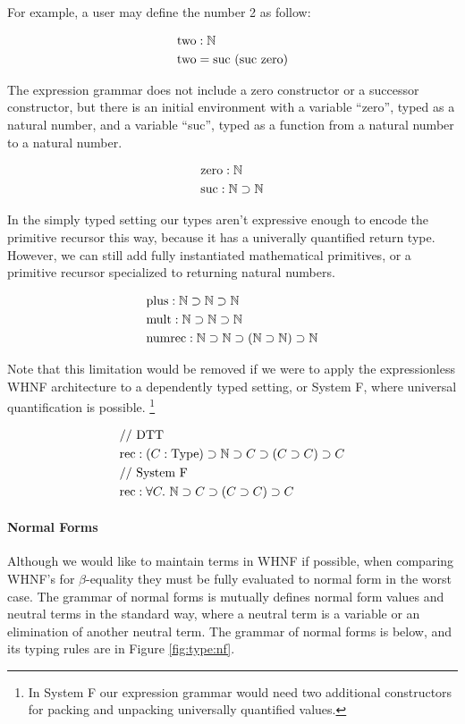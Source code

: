 \documentclass[preprint,authoryear]{sigplanconf}
\def\asc{:}
\def\arr{\supset}
\def\nat{\mathbb{N}}
\def\zero{\con{zero}}
\newcommand{\suc}[1]{\con{suc}~#1}
\newcommand{\con}[1]{\textmd{#1}}
\newcommand{\reffig}[1]{Figure \ref{fig:#1}}
\begin{document}
For example, a user may define the number 2 as follow:

\begin{align*}
&\con{two} : \nat\\
&\con{two} = \suc{(\suc{\zero})}
\end{align*}

The expression grammar does not include a zero constructor or a
successor constructor, but there is an initial environment with a
variable ``zero'', typed as a natural number, and a variable ``suc'',
typed as a function from a natural number to a natural number.

\begin{align*}
&\con{zero} : \nat\\
&\con{suc} : \nat \arr \nat
\end{align*}

In the simply typed setting our types aren't expressive enough to
encode the primitive recursor this way, because it has a univerally
quantified return type. However, we can still add fully instantiated
mathematical primitives, or a primitive recursor specialized to
returning natural numbers.

\begin{align*}
&\con{plus} : \nat \arr \nat \arr \nat\\
&\con{mult} : \nat \arr \nat \arr \nat\\
&\con{numrec} : \nat \arr \nat \arr (\nat \arr \nat) \arr \nat
\end{align*}

Note that this limitation would be removed if we were to apply the
expressionless WHNF architecture to a dependently typed setting, or
System F, where universal quantification is possible.
\footnote{In System F our expression grammar would need two
  additional constructors for packing and unpacking universally
  quantified values.}

\begin{align*}
&//~ \con{DTT}\\
&\con{rec} : (C \asc \con{Type}) \arr \nat \arr C \arr (C \arr C) \arr C\\
&//~ \con{System F}\\
&\con{rec} : \forall C.~ \nat \arr C \arr (C \arr C) \arr C
\end{align*}

\paragraph{Normal Forms}
Although we would like to maintain terms in WHNF if possible, when
comparing WHNF's for $\beta$-equality they must be fully evaluated
to normal form in the worst case. The grammar of normal forms is
mutually defines normal form values and neutral terms in the standard
way, where a neutral term is a variable or an elimination of another
neutral term. The grammar of normal forms is below, and
its typing rules are in \reffig{type:nf}.
\end{document}

